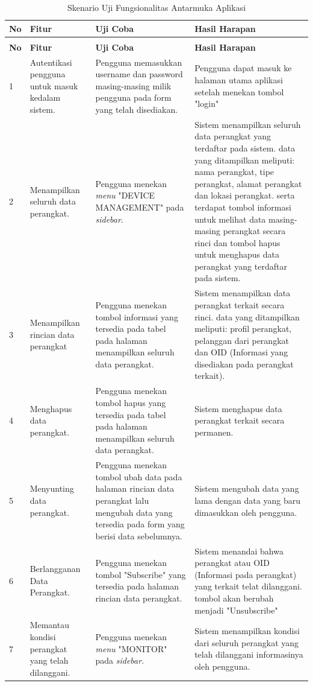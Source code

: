             \begin{longtable}{|p{}|p{}|p{}|p{}|}					\caption{Skenario Uji Fungsionalitas Antarmuka Aplikasi} \label{ujiaplikasi} \\
					\hline
					\textbf{No} & \textbf{Fitur} & \textbf{Uji Coba} & \textbf{Hasil Harapan} \\ \hline
					\endfirsthead
					\caption[]{Skenario Uji Fungsionalitas Antarmuka Aplikasi} \\
					\hline
					\textbf{No} & \textbf{Fitur} & \textbf{Uji Coba} & \textbf{Hasil Harapan} \\ \hline
					\endhead
					\endfoot
					\endlastfoot
					
                    1 & Autentikasi pengguna untuk masuk kedalam sistem. & Pengguna memasukkan username dan password masing-masing milik pengguna pada form yang telah disediakan. & Pengguna dapat masuk ke halaman utama aplikasi setelah menekan tombol "login"\\ \hline
                    2 & Menampilkan seluruh data perangkat. & Pengguna menekan \textit{menu} "DEVICE MANAGEMENT" pada \textit{sidebar}. & Sistem menampilkan seluruh data perangkat yang terdaftar pada sistem. data yang ditampilkan meliputi: nama perangkat, tipe perangkat, alamat perangkat dan lokasi perangkat. serta terdapat tombol informasi untuk melihat data masing-masing perangkat secara rinci dan tombol hapus untuk menghapus data perangkat yang terdaftar pada sistem. \\ \hline
                    3 & Menampilkan rincian data perangkat & Pengguna menekan tombol informasi yang tersedia pada tabel pada halaman menampilkan seluruh data perangkat. & Sistem menampilkan data perangkat terkait secara rinci. data yang ditampilkan meliputi: profil perangkat, pelanggan dari perangkat dan OID (Informasi yang disediakan pada perangkat terkait). \\ \hline
                    4 & Menghapus data perangkat. & Pengguna menekan tombol hapus yang tersedia pada tabel pada halaman menampilkan seluruh data perangkat. & Sistem menghapus data perangkat terkait secara permanen. \\ \hline
					5 & Menyunting data perangkat. & Pengguna menekan tombol ubah data pada halaman rincian data perangkat lalu mengubah data yang tersedia pada form yang berisi data sebelumnya. & Sistem mengubah data yang lama dengan data yang baru dimasukkan oleh pengguna. \\ \hline
                    6 & Berlangganan Data Perangkat. & Pengguna menekan tombol "Subscribe" yang tersedia pada halaman rincian data perangkat. & Sistem menandai bahwa perangkat atau OID (Informasi pada perangkat) yang terkait telat dilanggani. tombol akan berubah menjadi "Unsubscribe"\\ \hline
                    7 & Memantau kondisi perangkat yang telah dilanggani. & Pengguna menekan \textit{menu} "MONITOR" pada \textit{sidebar}. & Sistem menampilkan kondisi dari seluruh perangkat yang telah dilanggani informasinya oleh pengguna. \\ \hline
				\end{longtable}
            
